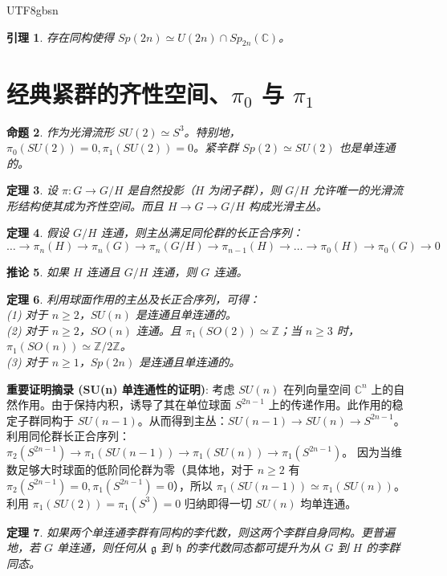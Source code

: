 \documentclass[11pt]{article}
\newtheorem{theorem}{定理}[section]
\newtheorem{lemma}[theorem]{引理}
\newtheorem{proposition}[theorem]{命题}
\newtheorem{corollary}[theorem]{推论}
\begin{document}
\begin{CJK*}{UTF8}{gbsn}
\begin{lemma}
存在同构使得 $Sp(2n) \simeq U(2n) \cap Sp_{2n}(\mathbb{C})$。
\end{lemma}

\section{经典紧群的齐性空间、$\pi_0$ 与 $\pi_1$}

\begin{proposition}
作为光滑流形 $SU(2) \simeq S^3$。特别地，$\pi_0(SU(2))=0, \pi_1(SU(2))=0$。紧辛群 $Sp(2) \simeq SU(2)$ 也是单连通的。
\end{proposition}

\begin{theorem}
设 $\pi: G \to G/H$ 是自然投影（$H$ 为闭子群），则 $G/H$ 允许唯一的光滑流形结构使其成为齐性空间。而且 $H \to G \to G/H$ 构成光滑主丛。
\end{theorem}

\begin{theorem}
假设 $G/H$ 连通，则主丛满足同伦群的长正合序列：
$$ \dots \to \pi_n(H) \to \pi_n(G) \to \pi_n(G/H) \to \pi_{n-1}(H) \to \dots \to \pi_0(H) \to \pi_0(G) \to 0 $$
\end{theorem}

\begin{corollary}
如果 $H$ 连通且 $G/H$ 连通，则 $G$ 连通。
\end{corollary}

\begin{theorem}
利用球面作用的主丛及长正合序列，可得：\\
(1) 对于 $n \ge 2$，$SU(n)$ 是连通且单连通的。\\
(2) 对于 $n \ge 2$，$SO(n)$ 连通。且 $\pi_1(SO(2)) \simeq \mathbb{Z}$；当 $n \ge 3$ 时，$\pi_1(SO(n)) \simeq \mathbb{Z}/2\mathbb{Z}$。\\
(3) 对于 $n \ge 1$，$Sp(2n)$ 是连通且单连通的。
\end{theorem}
\textbf{重要证明摘录 (SU(n) 单连通性的证明)}:
考虑 $SU(n)$ 在列向量空间 $\mathbb{C}^n$ 上的自然作用。由于保持内积，诱导了其在单位球面 $S^{2n-1}$ 上的传递作用。此作用的稳定子群同构于 $SU(n-1)$。从而得到主丛：$SU(n-1) \to SU(n) \to S^{2n-1}$。
利用同伦群长正合序列：$\pi_2(S^{2n-1}) \to \pi_1(SU(n-1)) \to \pi_1(SU(n)) \to \pi_1(S^{2n-1})$。
因为当维数足够大时球面的低阶同伦群为零（具体地，对于 $n \ge 2$ 有 $\pi_2(S^{2n-1}) = 0, \pi_1(S^{2n-1}) = 0$），所以 $\pi_1(SU(n-1)) \simeq \pi_1(SU(n))$。利用 $\pi_1(SU(2)) = \pi_1(S^3) = 0$ 归纳即得一切 $SU(n)$ 均单连通。

\begin{theorem}
如果两个单连通李群有同构的李代数，则这两个李群自身同构。更普遍地，若 $G$ 单连通，则任何从 $\mathfrak{g}$ 到 $\mathfrak{h}$ 的李代数同态都可提升为从 $G$ 到 $H$ 的李群同态。
\end{theorem}

\end{CJK*}
\end{document}
